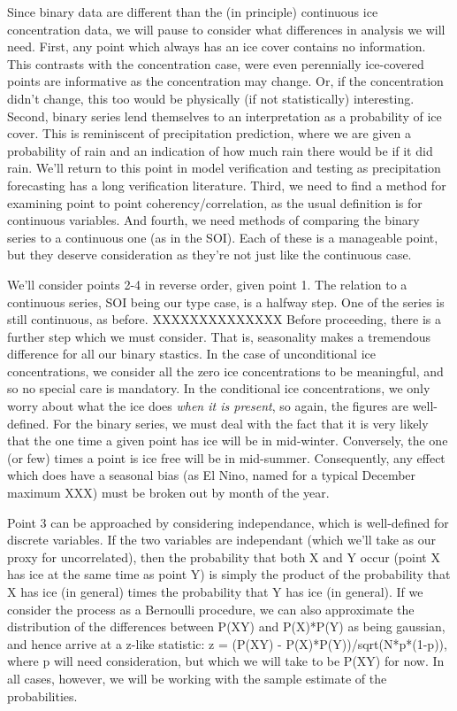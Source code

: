   Since binary data are different than the (in principle) continuous ice
concentration data, we will pause to consider what differences in analysis
we will need.  First, any point which always has an ice cover contains no
information.  This contrasts with the concentration case, were even perennially
ice-covered points are informative as the concentration may change.  Or, if
the concentration didn't change, this too would be physically (if not 
statistically) interesting.  Second, binary series lend themselves to an
interpretation as a probability of ice cover.  This is reminiscent of
precipitation prediction, where we are given a probability of rain and
an indication of how much rain there would be if it did rain.  We'll return
to this point in model verification and testing as precipitation forecasting
has a long verification literature.  Third, we need to find a method
for examining point to point coherency/correlation, as the usual definition
is for continuous variables.  And fourth, we need methods of comparing the
binary series to a continuous one (as in the SOI).  Each of these is a 
manageable point, but they deserve consideration as they're not just like
the continuous case.

  We'll consider points 2-4 in reverse order, given point 1.  The relation
to a continuous series, SOI being our type case, is a halfway step.  One
of the series is still continuous, as before.   
XXXXXXXXXXXXXX
  Before proceeding, there is a further step which we must consider.
That is, seasonality makes a tremendous difference for all our binary
stastics.  In the case of unconditional ice concentrations, we consider
all the zero ice concentrations to be meaningful, and so no special care
is mandatory.  In the conditional ice concentrations, we only worry about
what the ice does {\it when it is present}, so again, the figures are
well-defined.  For the binary series, we must deal with the fact that 
it is very likely that the one time a given point has ice will be in
mid-winter.  Conversely, the one (or few) times a point is ice free
will be in mid-summer.  Consequently, any effect which does have a seasonal
bias (as El Nino, named for a typical December maximum XXX) must be
broken out by month of the year.


  Point 3 can be approached by considering independance, which is
well-defined for discrete variables.  If the two variables are
independant (which we'll take as our proxy for uncorrelated), then
the probability that both X and Y occur (point X has ice at the same
time as point Y) is simply the product of the probability that
X has ice (in general) times the probability that Y has ice (in general).
If we consider the process as a Bernoulli procedure, we can also 
approximate the distribution of the differences between P(XY) and
P(X)*P(Y) as being gaussian, and hence arrive at a z-like statistic:
z = (P(XY) - P(X)*P(Y))/sqrt(N*p*(1-p)), where p will need consideration,
but which we will take to be P(XY) for now.  In all cases, however, 
we will be working with the sample estimate of the probabilities.




